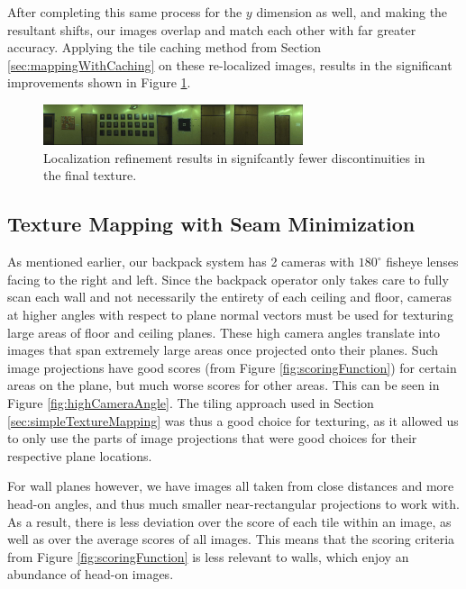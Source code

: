 \message{ !name(paper.tex)}\documentclass[10pt,twocolumn,letterpaper]{article}
\begin{document}
After completing this same process for the $y$ dimension as well, and
making the resultant shifts, our images overlap and
match each other with far greater accuracy. Applying the tile caching method from Section \ref{sec:mappingWithCaching} on these re-localized images, results in the significant improvements shown in Figure \ref{fig:shifted}.

\begin{figure}
  \centering
  \includegraphics[width=3in]{wall1_cache_full_shifted.jpg}
  \caption{Localization refinement results in signifcantly fewer
    discontinuities in the final texture.}
  \label{fig:shifted}
\end{figure}



\subsection{Texture Mapping with Seam Minimization}
\label{sec:seamMinimization}

As mentioned earlier, our backpack system has 2 cameras with
$180^\circ$ fisheye lenses facing to the right and left. Since the
backpack operator only takes care to fully scan each wall and not
necessarily the entirety of each ceiling and floor, cameras at higher
angles with respect to plane normal vectors must be used for texturing
large areas of floor and ceiling planes. These high camera angles
translate into images that span extremely large areas once projected
onto their planes. Such image projections have good scores (from
Figure \ref{fig:scoringFunction}) for certain areas on the plane, but
much worse scores for other areas. This can be seen in Figure
\ref{fig:highCameraAngle}. The tiling approach used in Section
\ref{sec:simpleTextureMapping} was thus a good choice for texturing,
as it allowed us to only use the parts of image projections that were
good choices for their respective plane locations.

For wall planes however, we have images all taken from close distances
and more head-on angles, and thus much smaller near-rectangular
projections to work with. As a result, there is less deviation over
the score of each tile within an image, as well as over the average
scores of all images. This means that the scoring criteria from Figure
\ref{fig:scoringFunction} is less relevant to walls, which enjoy an
abundance of head-on images.
\end{document}
